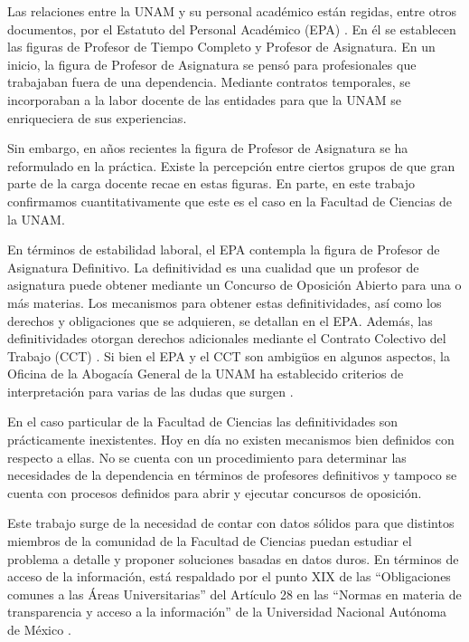 \documentclass[twocolumn]{article}
\theoremstyle{definition}
\begin{document}
Las relaciones entre la UNAM y su personal académico están regidas, entre otros documentos, por el Estatuto del Personal Académico (EPA) \cite{epa}. En él se establecen las figuras de Profesor de Tiempo Completo y Profesor de Asignatura. En un inicio, la figura de Profesor de Asignatura se pensó para profesionales que trabajaban fuera de una dependencia. Mediante contratos temporales, se incorporaban a la labor docente de las entidades para que la UNAM se enriqueciera de sus experiencias.

Sin embargo, en años recientes la figura de Profesor de Asignatura se ha reformulado en la práctica. Existe la percepción entre ciertos grupos de que gran parte de la carga docente recae en estas figuras. En parte, en este trabajo confirmamos cuantitativamente que este es el caso en la Facultad de Ciencias de la UNAM.

En términos de estabilidad laboral, el EPA contempla la figura de Profesor de Asignatura Definitivo. La definitividad es una cualidad que un profesor de asignatura puede obtener mediante un Concurso de Oposición Abierto para una o más materias. Los mecanismos para obtener estas definitividades, así como los derechos y obligaciones que se adquieren, se detallan en el EPA. Además, las definitividades otorgan derechos adicionales mediante el Contrato Colectivo del Trabajo (CCT) \cite{cct}. Si bien el EPA y el CCT son ambigüos en algunos aspectos, la Oficina de la Abogacía General de la UNAM ha establecido criterios de interpretación para varias de las dudas que surgen \cite{cri1,cri2}.

En el caso particular de la Facultad de Ciencias las definitividades son prácticamente inexistentes. Hoy en día no existen mecanismos bien definidos con respecto a ellas. No se cuenta con un procedimiento para determinar las necesidades de la dependencia en términos de profesores definitivos y tampoco se cuenta con procesos definidos para abrir y ejecutar concursos de oposición.

Este trabajo surge de la necesidad de contar con datos sólidos para que distintos miembros de la comunidad de la Facultad de Ciencias puedan estudiar el problema a detalle y proponer soluciones basadas en datos duros. En términos de acceso de la información, está respaldado por el punto XIX de las ``Obligaciones comunes a las Áreas Universitarias'' del Artículo 28 en las ``Normas en materia de transparencia y acceso a la información'' de la Universidad Nacional Autónoma de México \cite{transparencia}.
\end{document}
